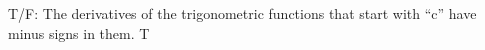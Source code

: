 {T/F: The derivatives of the trigonometric functions that start with ``c'' have minus signs in them.
}
{T
}
